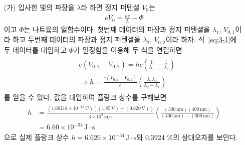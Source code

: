 \documentclass[tightenlines,floatfix,nofootinbib,superscriptaddress,fleqn]{revtex4}
\begin{document}
\begin{itemize}
  \item[(가)]
  입사한 빛의 파장을 $\lambda$라 하면 정지 퍼텐셜 $V_0$는
  \begin{align}\label{eq:3-1}
    eV_0=\frac{hc}{\lambda}-\Phi 
  \end{align}
  이고 $\Phi$는 나트륨의 일함수이다. 첫번째 데이터의 파장과 정지 퍼텐셜을 $\lambda_1$,
  $V_{0,1}$이라 하고 두번째 데이터의 파장과 정지 퍼텐셜을 $\lambda_2$,
  $V_{0,2}$이라 하자. 식~\eqref{eq:3-1}에 두 데이터를 대입하고 $\Phi$가 일정함을 이용해
  두 식을 연립하면
  \begin{align}
    \begin{split}
      & e(V_{0,1}-V_{0,2}) = hc\left(\frac{1}{\lambda_1}-\frac{1}{\lambda_2}\right) \\
      &\Longrightarrow h =\frac{e(V_{0,1}-V_{0,2})}{c}\left(\frac{\lambda_1\lambda_2}
      {\lambda_2-\lambda_1}\right)
    \end{split}
  \end{align}
  를 얻을 수 있다. 값을 대입하여 플랑크 상수를 구해보면
  \begin{align}
    \begin{split}
      h &=\frac{(1.60218\times 10^{-19}\,\mathrm{C})
      ((1.85\,\mathrm{V})-(0.820\,\mathrm{V}))}{3\times 10^{8}\,\mathrm{m/s}}\left(
        \frac{(300\,\mathrm{nm})(400\,\mathrm{nm})}
        {(400\,\mathrm{nm})-(300\,\mathrm{nm})}\right)  \\
        &=6.60\times 10^{-34}\,\mathrm{J\cdot s}
      \end{split}
  \end{align}
  으로 실제 플랑크 상수 $h=6.626\times 10^{-34}\,\mathrm{J\cdot s}$와 0.3924 \%의 상대오차를
  보인다.

\end{itemize}
\end{document}
